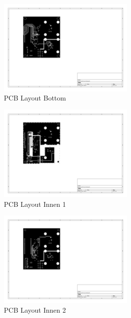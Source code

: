 \documentclass[11pt,a4paper,hidelinks]{article}
\begin{document}
\begin{figure}[H]
    \centering
    \includegraphics[trim=130 220 450 80, clip, width=0.6\textwidth]{attachments/pcb_B_Cu.pdf}
    \caption{PCB Layout Bottom}\label{fig:pcb_b_cu}
\end{figure}

\begin{figure}[H]
    \centering
    \includegraphics[trim=130 220 450 80, clip, width=0.6\textwidth]{attachments/pcb_In1_Cu.pdf}
    \caption{PCB Layout Innen 1}\label{fig:pcb_in1_cu}
\end{figure}

\begin{figure}[H]
    \centering
    \includegraphics[trim=130 220 450 80, clip, width=0.6\textwidth]{attachments/pcb_In2_Cu.pdf}
    \caption{PCB Layout Innen 2}\label{fig:pcb_in2_cu}
\end{figure}
\end{document}
